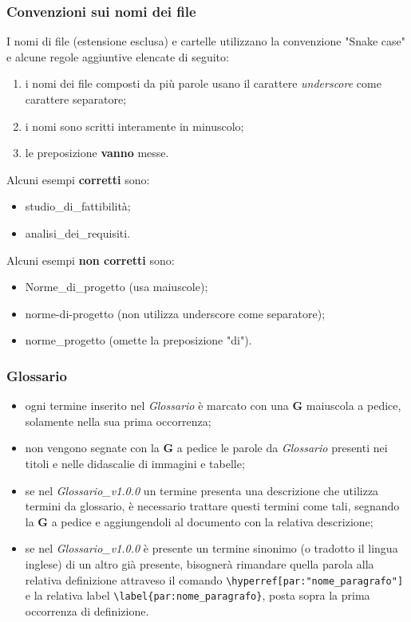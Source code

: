 \subsubsection{Convenzioni sui nomi dei file}
I nomi di file (estensione esclusa) e cartelle utilizzano la convenzione "Snake case\glo" e alcune regole aggiuntive elencate di seguito: \begin{enumerate}
\item i nomi dei file composti da più parole usano il carattere \textit{underscore} come carattere separatore;
\item i nomi sono scritti interamente in minuscolo;
\item le preposizione \textbf{vanno} messe.
\end{enumerate}
Alcuni esempi \textbf{corretti} sono: \begin{itemize}
\item studio\_di\_fattibilità;
\item analisi\_dei\_requisiti.
\end{itemize}
Alcuni esempi \textbf{non corretti} sono: \begin{itemize}
\item Norme\_di\_progetto (usa maiuscole);
\item norme-di-progetto (non utilizza underscore come separatore);
\item norme\_progetto (omette la preposizione "di").
\end{itemize}

\subsubsection{Glossario}
\begin{itemize}
\item ogni termine inserito nel \textit{Glossario} è marcato con una \textbf{G} maiuscola a pedice, solamente nella sua prima occorrenza;
\item non vengono segnate con la \textbf{G} a pedice le parole da \textit{Glossario} presenti nei titoli e nelle didascalie di immagini e tabelle;
\item se nel \textit{Glossario}\textit{\_}\textit{v1.0.0} un termine presenta una descrizione che utilizza termini da glossario, è necessario trattare questi termini come tali, segnando la \textbf{G} a pedice e aggiungendoli al documento con la relativa descrizione;
\item se nel \textit{Glossario}\textit{\_}\textit{v1.0.0} è presente un termine sinonimo (o tradotto il lingua inglese) di un altro già presente, bisognerà rimandare quella parola alla relativa definizione attraveso il comando \verb|\hyperref[par:"nome_paragrafo"]| e la relativa label \verb|\label{par:nome_paragrafo}|, posta sopra la prima occorrenza di definizione.
\end{itemize}
